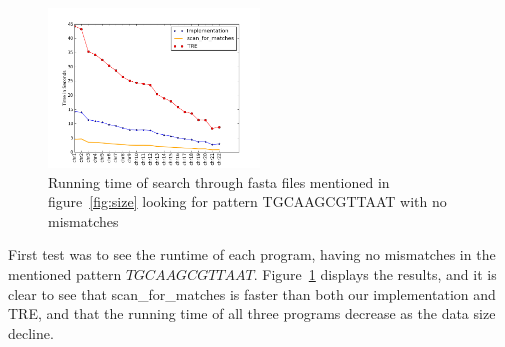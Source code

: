 \begin{figure}[h!]
\centering
\includegraphics[width=0.5\textwidth]{Benchmarking/0miss.png}
\caption{Running time of search through fasta files mentioned in figure~\ref{fig:size} looking for pattern TGCAAGCGTTAAT with no mismatches}
\label{fig:0miss}
\end{figure}

First test was to see the runtime of each program, having no mismatches in the mentioned pattern $TGCAAGCGTTAAT$. Figure~\ref{fig:0miss} displays the results, and it is clear to see that scan\_for\_matches is faster than both our implementation and TRE, and that the running time of all three programs decrease as the data size decline.

